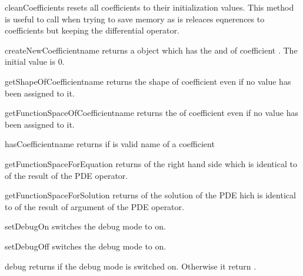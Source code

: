 \begin{methoddesc}[LinearPDE]{cleanCoefficients}{}
resets all coefficients to their initialization values. This method is useful to call when trying to save memory
as is releaces eqnerences to coefficients but keeping the differential operator.
\end{methoddesc}
\begin{methoddesc}[LinearPDE]{createNewCoefficient}{name}
returns a \Data object which has the \FunctionSpace and \Shape of coefficient . The initial value is $0$.
\end{methoddesc}

\begin{methoddesc}[LinearPDE]{getShapeOfCoefficient}{name}
returns the shape of coefficient  even if no value has been assigned to it.
\end{methoddesc}


\begin{methoddesc}[LinearPDE]{getFunctionSpaceOfCoefficient}{name}
returns the \FunctionSpace of coefficient  even if no value has been assigned to it.
\end{methoddesc}

\begin{methoddesc}[LinearPDE]{hasCoefficient}{name}
returns \True if  is valid name of a coefficient
\end{methoddesc}


\begin{methoddesc}[LinearPDE]{getFunctionSpaceForEquation}{}
returns \FunctionSpace of the right hand side which is identical to \FunctionSpace of 
the result of the PDE operator.
\end{methoddesc}

\begin{methoddesc}[LinearPDE]{getFunctionSpaceForSolution}{}
returns \FunctionSpace of the solution of the PDE hich is identical to \FunctionSpace of 
the result of argument of the PDE operator.
\end{methoddesc}

\begin{methoddesc}[LinearPDE]{setDebugOn}{}
switches the debug mode to on.
\end{methoddesc}

\begin{methoddesc}[LinearPDE]{setDebugOff}{}
switches the debug mode to on.
\end{methoddesc}

\begin{methoddesc}[LinearPDE]{debug}{}
returns \True if the debug mode is switched on. Otherwise it return \False.
\end{methoddesc}

